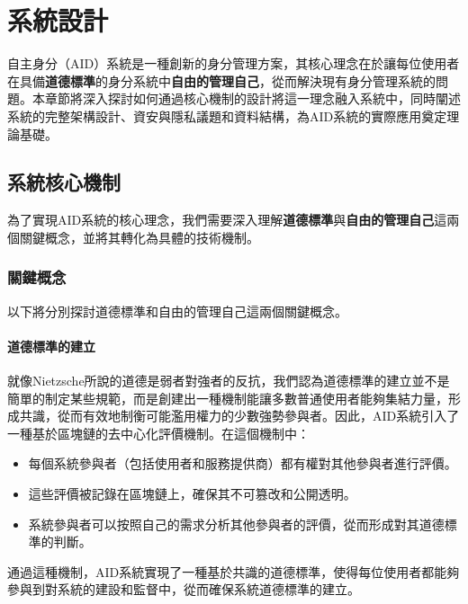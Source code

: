 
\chapter{系統設計}
自主身分（AID）系統是一種創新的身分管理方案，其核心理念在於讓每位使用者在具備\textbf{道德標準}的身分系統中\textbf{自由的管理自己}，從而解決現有身分管理系統的問題。本章節將深入探討如何通過核心機制的設計將這一理念融入系統中，同時闡述系統的完整架構設計、資安與隱私議題和資料結構，為AID系統的實際應用奠定理論基礎。
\section{系統核心機制}
為了實現AID系統的核心理念，我們需要深入理解\textbf{道德標準}與\textbf{自由的管理自己}這兩個關鍵概念，並將其轉化為具體的技術機制。
\subsection{關鍵概念}
以下將分別探討道德標準和自由的管理自己這兩個關鍵概念。
\subsubsection{道德標準的建立}
就像Nietzsche所說的道德是弱者對強者的反抗，我們認為道德標準的建立並不是簡單的制定某些規範，而是創建出一種機制能讓多數普通使用者能夠集結力量，形成共識，從而有效地制衡可能濫用權力的少數強勢參與者。因此，AID系統引入了一種基於區塊鏈的去中心化評價機制。在這個機制中：
\begin{itemize}
  \item 每個系統參與者（包括使用者和服務提供商）都有權對其他參與者進行評價。
  \item 這些評價被記錄在區塊鏈上，確保其不可篡改和公開透明。
  \item 系統參與者可以按照自己的需求分析其他參與者的評價，從而形成對其道德標準的判斷。
\end{itemize}
通過這種機制，AID系統實現了一種基於共識的道德標準，使得每位使用者都能夠參與到對系統的建設和監督中，從而確保系統道德標準的建立。
